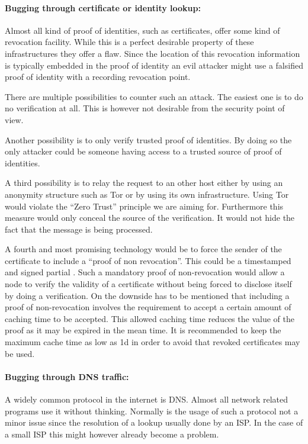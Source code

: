 \paragraph{Bugging through certificate or identity lookup:} Almost all kind of proof of identities, such as certificates, offer some kind of revocation facility. While this is a perfect desirable property of these infrastructures they offer a flaw. Since the location of this revocation information is typically embedded in the proof of identity an evil attacker might use a falsified proof of identity with a recording revocation point.
	      
There are multiple possibilities to counter such an attack. The easiest one is to do no verification at all. This is however not desirable from the security point of view. 

Another possibility is to only verify trusted proof of identities. By doing so the only attacker could be someone having access to a trusted source of proof of identities. 

A third possibility is to relay the request to an other host either by using an anonymity structure such as Tor or by using its own infrastructure. Using Tor would violate the ``Zero Trust'' principle we are aiming for. Furthermore this measure would only conceal the source of the verification. It would not hide the fact that the message is being processed. 

A fourth and most promising technology would be to force the sender of the certificate to include a ``proof of non revocation''. This could be a timestamped and signed partial . Such a mandatory proof of non-revocation would allow a node to verify the validity of a certificate without being forced to disclose itself by doing a verification. On the downside has to be mentioned that including a proof of non-revocation involves the requirement to accept a certain amount of caching time to be accepted. This allowed caching time reduces the value of the proof as it may be expired in the mean time. It is recommended to keep the maximum cache time as low as 1d in order to avoid that revoked certificates may be used. 

\paragraph{Bugging through DNS traffic:} A widely common protocol in the internet is DNS. Almost all network related programs use it without thinking. Normally is the usage of such a protocol not a minor issue since the resolution of a lookup usually done by an ISP. In the case of a small ISP this might however already become a problem.

